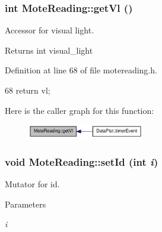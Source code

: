 \hypertarget{classMoteReading_a88ed6ea245c7af79e38ff8976f849f36}{
\subsubsection[{getVl}]{\setlength{\rightskip}{0pt plus 5cm}int MoteReading::getVl ()}}
\label{classMoteReading_a88ed6ea245c7af79e38ff8976f849f36}


Accessor for visual light. 

\begin{DoxyReturn}{Returns}
int visual\_\-light 
\end{DoxyReturn}


Definition at line 68 of file motereading.h.




\begin{DoxyCode}
68 { return vl; }
\end{DoxyCode}




Here is the caller graph for this function:\nopagebreak
\begin{figure}[H]
\begin{center}
\leavevmode
\includegraphics[width=144pt]{classMoteReading_a88ed6ea245c7af79e38ff8976f849f36_icgraph}
\end{center}
\end{figure}


\hypertarget{classMoteReading_a61f08f015a9f833ff7352c378b7799c2}{
\subsubsection[{setId}]{\setlength{\rightskip}{0pt plus 5cm}void MoteReading::setId (int {\em i})}}
\label{classMoteReading_a61f08f015a9f833ff7352c378b7799c2}


Mutator for id. 


\begin{DoxyParams}{Parameters}
\item[{\em i}]\end{DoxyParams}


